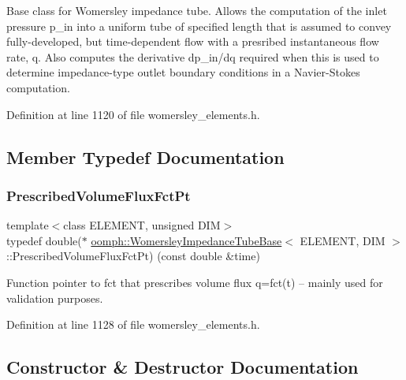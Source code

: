 Base class for Womersley impedance tube. Allows the computation of the inlet pressure p\+\_\+in into a uniform tube of specified length that is assumed to convey fully-\/developed, but time-\/dependent flow with a presribed instantaneous flow rate, q. Also computes the derivative dp\+\_\+in/dq required when this is used to determine impedance-\/type outlet boundary conditions in a Navier-\/\+Stokes computation. 

Definition at line 1120 of file womersley\+\_\+elements.\+h.



\subsection{Member Typedef Documentation}
\mbox{\label{classoomph_1_1WomersleyImpedanceTubeBase_a329107c12ef8f97c5afd4e0ae5d67b70}} 
\subsubsection{\texorpdfstring{Prescribed\+Volume\+Flux\+Fct\+Pt}{PrescribedVolumeFluxFctPt}}
{\footnotesize\ttfamily template$<$class E\+L\+E\+M\+E\+NT, unsigned D\+IM$>$ \\
typedef double($\ast$ \hyperlink{classoomph_1_1WomersleyImpedanceTubeBase}{oomph\+::\+Womersley\+Impedance\+Tube\+Base}$<$ E\+L\+E\+M\+E\+NT, D\+IM $>$\+::Prescribed\+Volume\+Flux\+Fct\+Pt) (const double \&time)}



Function pointer to fct that prescribes volume flux q=fct(t) -- mainly used for validation purposes. 



Definition at line 1128 of file womersley\+\_\+elements.\+h.



\subsection{Constructor \& Destructor Documentation}
\mbox{\label{classoomph_1_1WomersleyImpedanceTubeBase_a552fa003624cfb4e31da70f800f0669c}} 
